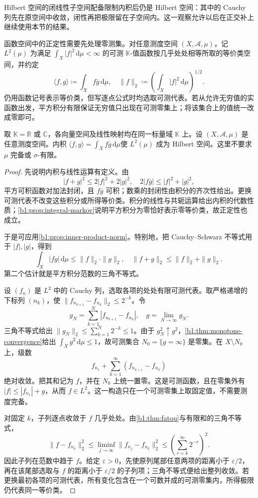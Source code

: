 Hilbert 空间的闭线性子空间配备限制内积后仍是 Hilbert 空间：其中的 Cauchy 列先在原空间中收敛，闭性再把极限留在子空间内。这一观察允许以后在正交补上继续使用本节的结果。

\ProseParagraphBreak

函数空间中的正定性需要先处理零测集。对任意测度空间 \((X,\mathcal A,\mu)\)，记 \(L^2(\mu)\) 为满足 \(\int_X|f|^2\,\mathrm d\mu<\infty\) 的可测 \(\mathbb K\)-值函数按几乎处处相等所取的等价类空间，并约定
\[
\langle f,g\rangle\coloneqq\int_Xf\overline g\,\mathrm d\mu,
\quad
\|f\|_2\coloneqq\left(\int_X|f|^2\,\mathrm d\mu\right)^{1/2}.
\]
仍用函数记号表示等价类，但写逐点公式时均选取可测代表。若从允许无穷值的实函数出发，平方积分有限保证无穷值只出现在可测零集上；将该集合上的值统一改成零即可。

\begin{theorem}[\(L^2\) 的完备性]\label{b1:thm:l2-hilbert}
取 \(\mathbb K=\mathbb R\) 或 \(\mathbb C\)，各向量空间及线性映射均在同一标量域 \(\mathbb K\) 上。设 \((X,\mathcal A,\mu)\) 是任意测度空间。内积 \(\langle f,g\rangle=\int_X f\overline g\,\mathrm d\mu\)使 \(L^2(\mu)\) 成为 Hilbert 空间。这里不要求 \(\mu\) 完备或 \(\sigma\)-有限。
\end{theorem}
\begin{proof}
先说明内积与线性运算有定义。由
\[
|f+g|^2\leq2|f|^2+2|g|^2,
\quad
2|f\overline g|\leq|f|^2+|g|^2,
\]
平方可积函数对加法封闭，且 \(f\overline g\) 可积；数乘的封闭性由积分的齐次性给出。更换可测代表不改变这些积分或所得等价类。积分的线性与共轭运算给出内积的代数性质；\cref{b1:prop:integral-markov}说明平方积分为零恰好表示零等价类，故正定性也成立。

于是可应用\cref{b1:prop:inner-product-norm}。特别地，把 Cauchy--Schwarz 不等式用于 \(|f|,|g|\)，得到
\[
\int_X|fg|\,\mathrm d\mu\leq\|f\|_2\cdot\|g\|_2,
\quad
\|f+g\|_2\leq\|f\|_2+\|g\|_2.
\]
第二个估计就是平方积分范数的三角不等式。

设 \((f_n)\) 是 \(L^2\) 中的 Cauchy 列，选取各项的处处有限可测代表。取严格递增的下标列 \((n_k)\)，使 \(\|f_{n_{k+1}}-f_{n_k}\|_2\leq2^{-k}\)。令
\[
g_N=\sum_{k=1}^N|f_{n_{k+1}}-f_{n_k}|,
\quad
g=\lim_{N\to\infty}g_N.
\]
三角不等式给出 \(\|g_N\|_2\leq\sum_{k=1}^N2^{-k}\leq1\)。由于 \(g_N^2\uparrow g^2\)，\cref{b1:thm:monotone-convergence}给出 \(\int_Xg^2\,\mathrm d\mu\leq1\)，故可测集合 \(N_0=\{g=\infty\}\) 是零集。在 \(X\setminus N_0\) 上，级数
\[
f_{n_1}+\sum_{k=1}^{\infty}\left(f_{n_{k+1}}-f_{n_k}\right)
\]
绝对收敛。把其和记为 \(f\)，并在 \(N_0\) 上统一置零。这是可测函数，且在零集外有 \(|f|\leq|f_{n_1}|+g\)，从而 \(f\in L^2\)。这一构造只在一个可测零集上取固定值，不需要测度完备。

对固定 \(k\)，子列逐点收敛于 \(f\) 几乎处处。由\cref{b1:thm:fatou}与有限和的三角不等式，
\[
\|f-f_{n_k}\|_2^2
\leq\liminf_{j\to\infty}\|f_{n_j}-f_{n_k}\|_2^2
\leq\left(\sum_{r=k}^{\infty}2^{-r}\right)^2.
\]
因此子列在范数中趋于 \(f\)。给定 \(\varepsilon>0\)，先使原列尾部任意两项的距离小于 \(\varepsilon/2\)，再在该尾部选取与 \(f\) 的距离小于 \(\varepsilon/2\) 的子列项；三角不等式便给出整列收敛。若更换最初各项的可测代表，所有变化包含在一个可数并成的可测零集内，所得极限仍代表同一等价类。
\end{proof}

